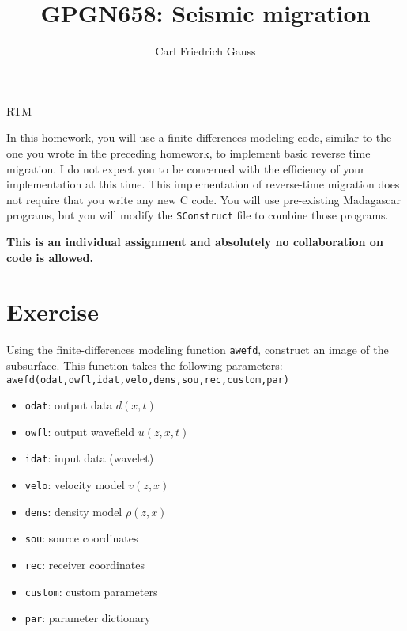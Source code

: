 \author{Carl Friedrich Gauss}
\title{GPGN658: Seismic migration}{RTM}

In this homework, you will use a finite-differences modeling code,
similar to the one you wrote in the preceding homework, to implement
basic reverse time migration. I do not expect you to be concerned with
the efficiency of your implementation at this time. This
implementation of reverse-time migration does not require that you
write any new C code. You will use pre-existing Madagascar programs,
but you will modify the \texttt{SConstruct} file to combine those
programs.

\textbf{This is an individual assignment and absolutely no
  collaboration on code is allowed.}


\section{Exercise}

Using the finite-differences modeling function \texttt{awefd},
construct an image of the subsurface. This function takes the
following parameters: \\
\texttt{awefd(odat,owfl,idat,velo,dens,sou,rec,custom,par)}
\begin{itemize}
\item \texttt{odat}: output data $d\left( x,t \right)$
\item \texttt{owfl}: output wavefield $u \left( z,x,t \right)$
\item \texttt{idat}: input data (wavelet)
\item \texttt{velo}: velocity model $v \left( z,x \right)$
\item \texttt{dens}: density model $\rho \left( z,x \right)$
\item \texttt{sou}: source coordinates
\item \texttt{rec}: receiver coordinates
\item \texttt{custom}: custom parameters
\item\texttt{par}: parameter dictionary
\end{itemize}

